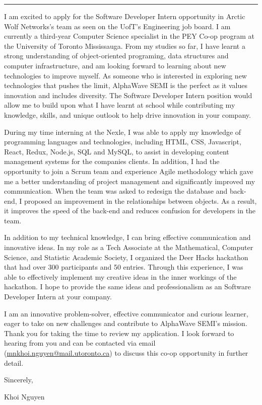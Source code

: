 \documentclass[
	12pt, %
]{resume} %
\begin{document}
    \medskip
    \hrule %
    \medskip
    
    I am excited to apply for the Software Developer Intern opportunity in Arctic Wolf Networks's team as seen on the UofT's Engineering job board. I am currently a third-year Computer Science specialist in the PEY Co-op program at the University of Toronto Mississauga. From my studies so far, I have learnt a strong understanding of object-oriented programing, data structures and computer infrastructure, and am looking forward to learning about new technologies to improve myself. As someone who is interested in exploring new technologies that pushes the limit, AlphaWave SEMI is the perfect as it values innovation and includes diversity. The Software Developer Intern position would allow me to build upon what I have learnt at school while contributing my knowledge, skills, and unique outlook to help drive innovation in your company.

    During my time interning at the Nexle, I was able to apply my knowledge of programming languages and technologies, including HTML, CSS, Javascript, React, Redux, Node.js, SQL and MySQL, to assist in developing content management systems for the companies clients. In addition, I had the opportunity to join a Scrum team and experience Agile methodology which gave me a better understanding of project management and significantly improved my communication. When the team was asked to redesign the database and back-end, I proposed an improvement in the relationships between objects. As a result, it improves the speed of the back-end and reduces confusion for developers in the team.

    In addition to my technical knowledge, I can bring effective communication and innovative ideas. In my role as a Tech Associate at the Mathematical, Computer Science, and Statistic Academic Society,  I organized the Deer Hacks hackathon that had over 300 participants and 50 entries. Through this experience, I was able to effectively implement my creative ideas in the inner workings of the hackathon. I hope to provide the same ideas and professionalism as an Software Developer Intern at your company.

    I am an innovative problem-solver, effective communicator and curious learner, eager to take on new challenges and contribute to AlphaWave SEMI's mission. Thank you for taking the time to review my application. I look forward to hearing from you and can be contacted via email (\href{mailto:mnkhoi.nguyen@mail.utoronto.ca}{mnkhoi.nguyen@mail.utoronto.ca}) to discuss this co-op opportunity in further detail.

    Sincerely,

    Khoi Nguyen
\end{document}
